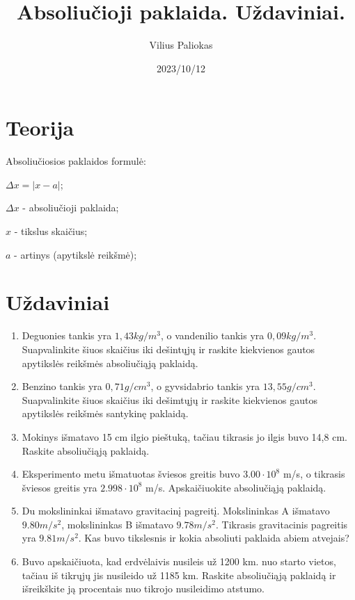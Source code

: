 \documentclass[32pt,a4paper]{article}
\title{Absoliučioji paklaida. Uždaviniai.}
\author{Vilius Paliokas}
\date{2023/10/12}
\begin{document}
\maketitle

\section*{Teorija}

Absoliučiosios paklaidos formulė:

$\Delta x=\left| x-a \right|$;

$\Delta x$ - absoliučioji paklaida;

$x$ - tikslus skaičius;

$a$ - artinys (apytikslė reikšmė);

\section*{Uždaviniai}

\begin{enumerate}
    \item Deguonies tankis yra $1,43 kg/m^{3}$, o vandenilio tankis yra $0,09
              kg/m^3$. Suapvalinkite šiuos skaičius iki dešintųjų ir raskite
          kiekvienos
          gautos apytikslės reikšmės absoliučiąją paklaidą.
    \item Benzino tankis yra $0,71 g/cm^{3}$, o gyvsidabrio tankis yra $13,55
              g/cm^{3}$. Suapvalinkite šiuos skaičius iki dešimtųjų ir raskite kiekvienos
          gautos apytikslės reikšmės santykinę paklaidą.
    \item Mokinys išmatavo 15 cm ilgio pieštuką, tačiau tikrasis jo ilgis buvo
          14,8 cm. Raskite absoliučiąją paklaidą.
    \item Eksperimento metu išmatuotas šviesos greitis buvo $3.00 \cdot 10^{8}$
          m/s, o tikrasis šviesos greitis yra $2.998 \cdot 10^{8}$ m/s.
          Apskaičiuokite absoliučiąją paklaidą.
    \item Du mokslininkai išmatavo gravitacinį pagreitį. Mokslininkas A
          išmatavo $9.80 m/s^{2}$, mokslininkas B išmatavo $9.78 m/s^2$.
          Tikrasis
          gravitacinis pagreitis yra $9.81 m/s^2$. Kas buvo tikslesnis ir kokia
          absoliuti paklaida abiem atvejais?
    \item Buvo apskaičiuota, kad erdvėlaivis nusileis už 1200 km. nuo
          starto vietos, tačiau iš tikrųjų jis nusileido už 1185 km. Raskite
          absoliučiąją paklaidą ir išreikškite ją procentais nuo tikrojo
          nusileidimo
          atstumo.
\end{enumerate}
\end{document}
